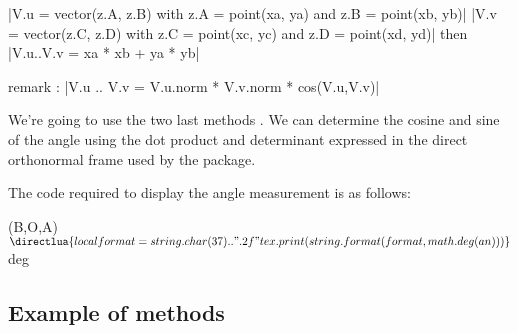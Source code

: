 \begin{mybox}
|V.u = vector(z.A, z.B) with z.A = point(xa, ya) and z.B = point(xb, yb)|
|V.v = vector(z.C, z.D) with z.C = point(xc, yc) and z.D = point(xd, yd)|
then |V.u..V.v = xa * xb +  ya * yb|
\end{mybox}

remark : |V.u .. V.v = V.u.norm * V.v.norm * cos(V.u,V.v)|


We're going to use the two last methods . We can determine the cosine and sine of the angle using the dot product and determinant expressed in the direct orthonormal frame used by the package.

\begin{minipage}{.5\textwidth}
\end{minipage}
\begin{minipage}{.5\textwidth}
\begin{tkzexample}
\end{tkzexample}
\end{minipage}

The code required to display the angle measurement is as follows:

\begin{tkzexample}
  \tkzLabelAngle[pos=2](B,O,A){$\directlua{
  local format = string.char(37) .. ".2f"
  tex.print(string.format( format , math.deg(an)))}$ deg}
\end{tkzexample}


\subsection{Example of methods}
